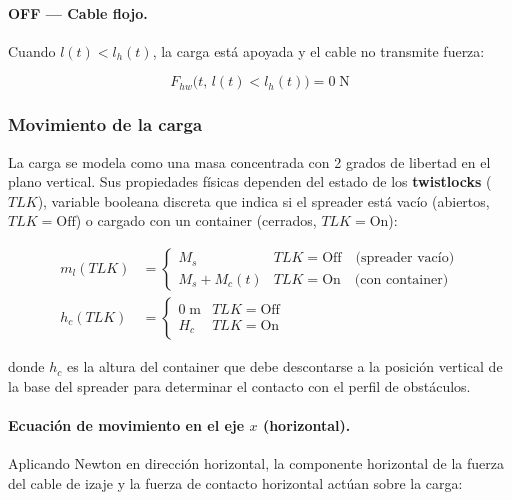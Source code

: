 \documentclass[12pt, a4paper]{article}
\begin{document}
\paragraph{OFF — Cable flojo.}

Cuando $l(t) < l_h(t)$, la carga está apoyada y el cable no transmite fuerza:

\begin{equation}
    \label{eq:cable-hoist-flojo}
    F_{hw}\!\bigl(t,\,l(t) < l_h(t)\bigr) = 0\;\text{N}
\end{equation}

\subsubsection{Movimiento de la carga}

La carga se modela como una masa concentrada con 2 grados de libertad en el plano
vertical. Sus propiedades físicas dependen del estado de los \textbf{twistlocks}
($TLK$), variable booleana discreta que indica si el spreader está vacío (abiertos,
$TLK=\text{Off}$) o cargado con un container (cerrados, $TLK=\text{On}$):

\begin{align}
    m_l(TLK) &= \begin{cases}
        M_s & TLK = \text{Off} \quad \text{(spreader vacío)} \\
        M_s + M_c(t) & TLK = \text{On} \quad \text{(con container)}
    \end{cases} \label{eq:tlk-mass} \\[6pt]
    h_c(TLK) &= \begin{cases}
        0\;\text{m} & TLK = \text{Off} \\
        H_c         & TLK = \text{On}
    \end{cases} \label{eq:tlk-hc}
\end{align}

donde $h_c$ es la altura del container que debe descontarse a la posición vertical de
la base del spreader para determinar el contacto con el perfil de obstáculos.

\paragraph{Ecuación de movimiento en el eje $x$ (horizontal).}

Aplicando Newton en dirección horizontal, la componente horizontal de la fuerza del
cable de izaje y la fuerza de contacto horizontal actúan sobre la carga:
\end{document}
